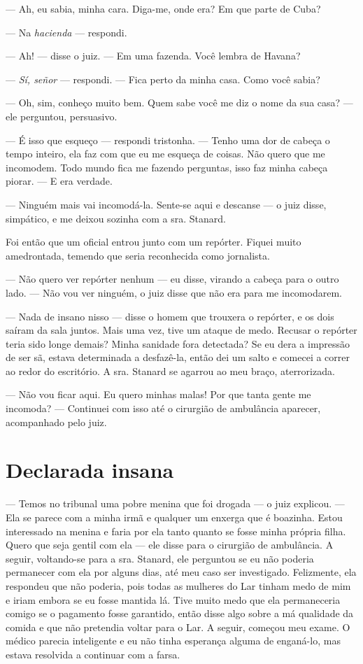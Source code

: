--- Ah, eu sabia, minha cara. Diga-me, onde era? Em que parte de Cuba?

--- Na \emph{hacienda} --- respondi.

--- Ah! --- disse o juiz. --- Em uma fazenda. Você lembra de Havana?

--- \emph{Sí, señor} --- respondi. --- Fica perto da
minha casa. Como você sabia?

--- Oh, sim, conheço muito bem. Quem sabe você me diz o nome da sua
casa? --- ele perguntou, persuasivo.

--- É isso que esqueço --- respondi tristonha. --- Tenho uma dor de
cabeça o tempo inteiro, ela faz com que eu me esqueça de coisas. Não
quero que me incomodem. Todo mundo fica me fazendo perguntas, isso faz
minha cabeça piorar. --- E era verdade.

--- Ninguém mais vai incomodá-la. Sente-se aqui e descanse --- o juiz
disse, simpático, e me deixou sozinha com a sra. Stanard.

Foi então que um oficial entrou junto com um repórter. Fiquei muito
amedrontada, temendo que seria reconhecida como jornalista. 

--- Não
quero ver repórter nenhum --- eu disse, virando a cabeça para o outro
lado. --- Não vou ver ninguém, o juiz disse que não era para me
incomodarem.

--- Nada de insano nisso --- disse o homem que trouxera o repórter, e os
dois saíram da sala juntos. Mais uma vez, tive um ataque de medo.
Recusar o repórter teria sido longe demais? Minha sanidade fora
detectada? Se eu dera a impressão de ser sã, estava determinada a
desfazê-la, então dei um salto e comecei a correr ao redor do
escritório. A sra. Stanard se agarrou ao meu braço, aterrorizada.

--- Não vou ficar aqui. Eu quero minhas malas! Por que tanta gente me
incomoda? --- Continuei com isso até o cirurgião de ambulância aparecer,
acompanhado pelo juiz.

\label{section-2}

\chapter{Declarada
insana}\label{capuxedtulo-v-declarada-insana}

--- Temos no tribunal uma pobre menina que foi drogada --- o juiz
explicou. --- Ela se parece com a minha irmã e qualquer um enxerga que é
boazinha. Estou interessado na menina e faria por ela tanto quanto se
fosse minha própria filha. Quero que seja gentil com ela --- ele disse
para o cirurgião de ambulância. A seguir, voltando-se para a sra.
Stanard, ele perguntou se eu não poderia permanecer com ela por alguns
dias, até meu caso ser investigado. Felizmente, ela respondeu que não
poderia, pois todas as mulheres do Lar tinham medo de mim e iriam embora
se eu fosse mantida lá. Tive muito medo que ela permaneceria comigo se o
pagamento fosse garantido, então disse algo sobre a má qualidade da
comida e que não pretendia voltar para o Lar. A seguir, começou meu
exame. O médico parecia inteligente e eu não tinha esperança alguma de
enganá-lo, mas estava resolvida a continuar com a farsa.

